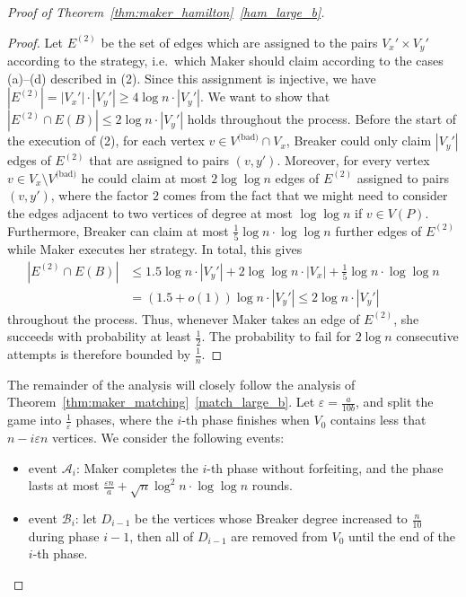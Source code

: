 \documentclass[11pt, a4paper]{article}
\numberwithin{equation}{section}
\numberwithin{figure}{section}
\newcommand{\eps}{\varepsilon}
\begin{document}
\begin{proof}[Proof of Theorem~\ref{thm:maker_hamilton}~\ref{ham_large_b}]
\begin{proof}
Let $E^{(2)}$ be the set of edges which are assigned to the pairs $V_x' \times V_y'$ according to the strategy, i.e.~which Maker should claim according to the cases (a)--(d) described in (2). Since this assignment is injective, we have $|E^{(2)}| = |V_x'|\cdot|V_y'| \geq 4\log n \cdot |V_y'|$. We want to show that $|E^{(2)} \cap E(B)| \leq 2\log n \cdot |V_y'|$ holds throughout the process. 
Before the start of the execution of (2), for each vertex $v\in V^{\text{(bad)}} \cap V_x$,  Breaker could only claim $|V_y'|$ edges of $E^{(2)}$ that are assigned to pairs $(v,y')$. Moreover, for every vertex $v \in V_x \setminus V^{\text{(bad)}}$ he could claim at most $2\log\log n$ edges of $E^{(2)}$ assigned to pairs $(v,y')$, where the factor $2$ comes from the fact that we might need to consider the edges adjacent to two vertices of degree at most $\log\log n$ if $v \in V(P)$. Furthermore, Breaker can claim at most 
$\frac15\log n\cdot \log\log n$ further edges of 
$E^{(2)}$ while Maker executes her strategy. 
In total, this gives 
\begin{align*}
|E^{(2)} \cap E(B)| &\leq 1.5\log n \cdot |V_y'| + 2\log\log n \cdot |V_x| + \frac15\log n\cdot \log\log n\\ 
& = (1.5 + o(1))\log n \cdot |V_y'| \leq 2\log n \cdot |V_y'|\end{align*}
throughout the process.
Thus, whenever Maker takes an edge of $E^{(2)}$, she succeeds with probability at least $\frac12$. The probability to fail for $2\log n$ consecutive attempts is therefore bounded by $\frac{1}{n}$.
\end{proof}

The remainder of the analysis will closely follow the analysis of Theorem~\ref{thm:maker_matching}~\ref{match_large_b}. Let $\eps = \frac{a}{10b}$, and split the game into 
$\frac{1}{\eps}$ phases, where the $i$-th phase finishes when $V_0$ contains less that $n - i\eps n$ vertices. We consider the following events:
\begin{itemize}
\item event $\mathcal{A}_i$: Maker completes the $i$-th phase without forfeiting, and the phase lasts at most $\frac{\eps n}{a} + \sqrt{n}\log^2 n \cdot \log\log n$ rounds.
\item event $\mathcal{B}_i$: 
let $D_{i-1}$ be the vertices
whose Breaker degree increased to $\frac{n}{10}$ during phase $i-1$, then all of $D_{i-1}$ are removed from $V_0$ until the end of the $i$-th phase.
\end{itemize}


\end{proof}
\end{document}
